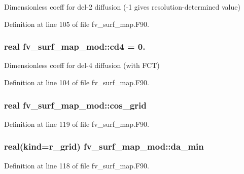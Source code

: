 Dimensionless coeff for del-\/2 diffusion (-\/1 gives resolution-\/determined value) 



Definition at line 105 of file fv\-\_\-surf\-\_\-map.\-F90.

\subsubsection[{cd4}]{\setlength{\rightskip}{0pt plus 5cm}real fv\-\_\-surf\-\_\-map\-\_\-mod\-::cd4 = 0.\hspace{0.3cm}{\ttfamily [private]}}\label{classfv__surf__map__mod_a533dee578c658a1a4e6533b71d4c89bc}


Dimensionless coeff for del-\/4 diffusion (with F\-C\-T) 



Definition at line 104 of file fv\-\_\-surf\-\_\-map.\-F90.

\subsubsection[{cos\-\_\-grid}]{\setlength{\rightskip}{0pt plus 5cm}real fv\-\_\-surf\-\_\-map\-\_\-mod\-::cos\-\_\-grid\hspace{0.3cm}{\ttfamily [private]}}\label{classfv__surf__map__mod_a770c3993e55f1b6b79cbe9fbbd5485e1}


Definition at line 119 of file fv\-\_\-surf\-\_\-map.\-F90.

\subsubsection[{da\-\_\-min}]{\setlength{\rightskip}{0pt plus 5cm}real(kind=r\-\_\-grid) fv\-\_\-surf\-\_\-map\-\_\-mod\-::da\-\_\-min\hspace{0.3cm}{\ttfamily [private]}}\label{classfv__surf__map__mod_a8346ce660fbc9bc7a10f64efe5be71ae}


Definition at line 118 of file fv\-\_\-surf\-\_\-map.\-F90.

